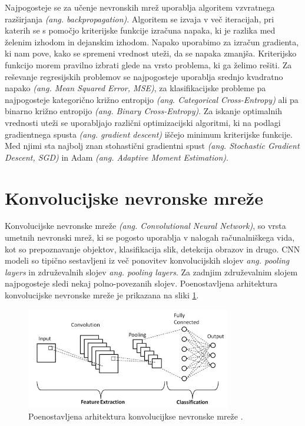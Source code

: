 \documentclass[a4paper,12pt,openright]{book}
\begin{document}
Najpogosteje se za učenje nevronskih mrež uporablja algoritem vzvratnega razširjanja \emph{(ang. backpropagation)}. Algoritem se izvaja v več iteracijah, pri katerih se s pomočjo kriterijske funkcije izračuna napaka, ki je razlika med želenim izhodom in dejanskim izhodom. Napako uporabimo za izračun gradienta, ki nam pove, kako se spremeni vrednost uteži, da se napaka zmanjša. Kriterijsko funkcijo morem pravilno izbrati glede na vrsto problema, ki ga želimo rešiti. Za reševanje regresijskih problemov se najpogosteje uporablja srednjo kvadratno napako \emph{(ang. Mean Squared Error, MSE)}, za klasifikacijske probleme pa najpogosteje kategorično križno entropijo \emph{(ang. Categorical Cross-Entropy)} ali pa binarno križno entropijo \emph{(ang. Binary Cross-Entropy)}. Za iskanje optimalnih vrednosti uteži se uporabljajo različni optimizacijski algoritmi, ki na podlagi gradientnega spusta \emph{(ang. gradient descent)} iščejo minimum kriterijske funkcije. Med njimi sta najbolj znan stohastični gradientni spust \emph{(ang. Stochastic Gradient Descent, SGD)} in Adam \emph{(ang. Adaptive Moment Estimation)}.

\section{Konvolucijske nevronske mreže}
Konvolucijske nevronske mreže \emph{(ang. Convolutional Neural Network)}, so vrsta umetnih nevronski mrež, ki se pogosto uporablja v nalogah računalniškega vida, kot so prepoznavanje objektov, klasifikacija slik, detekcija obrazov in drugo. CNN modeli so tipično sestavljeni iz več ponovitev konvolucijskih slojev \emph{ang. pooling layers} in združevalnih slojev \emph{ang. pooling layers}. Za zadnjim združevalnim slojem najpogosteje sledi nekaj polno-povezanih slojev. Poenostavljena arhitektura konvolucijske nevronske mreže je prikazana na sliki \ref{img:cnn}.


\begin{figure}[htb]
    \begin{center}
        \includegraphics[width=0.8\textwidth]{img/cnn.jpg}
    \end{center}
    \caption{Poenostavljena arhitektura konvolucijkse nevronske mreže \cite{cnn}.}
    \label{img:cnn}
\end{figure}
\end{document}
